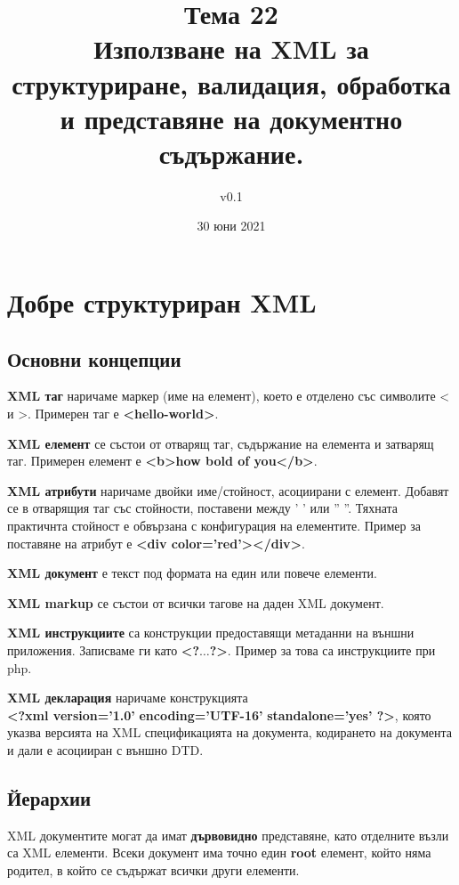 \documentclass[fleqn,12pt]{article}
\title{Тема 22 \\Използване на XML за структуриране, валидация, обработка и представяне на документно съдържание.}
\author{v0.1}
\date{30 юни 2021}
\begin{document}
\maketitle
\tableofcontents
\pagebreak

\section{Добре структуриран XML}

\subsection{Основни концепции}

\textbf{XML таг} наричаме маркер (име на елемент), което е отделено със символите < и >. Примерен таг е \textbf{<hello-world>}.
\bigbreak

\textbf{XML елемент} се състои от отварящ таг, съдържание на елемента и затварящ таг. Примерен елемент е \textbf{<b>how bold of you</b>}.
\bigbreak

\textbf{XML атрибути} наричаме двойки име/стойност, асоциирани с елемент.
Добавят се в отварящия таг със стойности, поставени между ' ' или '' ''.
Тяхната практичнта стойност е обвързана с конфигурация на елементите.
Пример за поставяне на атрибут е \textbf{<div color='red'></div>}.
\bigbreak

\textbf{XML документ} е текст под формата на един или повече елементи.
\bigbreak

\textbf{XML markup} се състои от всички тагове на даден XML документ.
\bigbreak

\textbf{XML инструкциите} са конструкции предоставящи метаданни на външни приложения. Записваме ги като \textbf{<?$\dots$?>}. Пример за това са инструкциите при php.
\bigbreak

\textbf{XML декларация} наричаме конструкцията \\\textbf{<?xml version='1.0'} \textbf{encoding='UTF-16'} \textbf{standalone='yes' ?>}, която указва версията на XML спецификацията на документа, кодирането на документа и дали е асоцииран с външно DTD.


\subsection{Йерархии}

XML документите могат да имат \textbf{дървовидно} представяне, като отделните възли са XML елементи.
Всеки документ има точно един \textbf{root} елемент, който няма родител, в който се съдържат всички други елементи.
\end{document}
